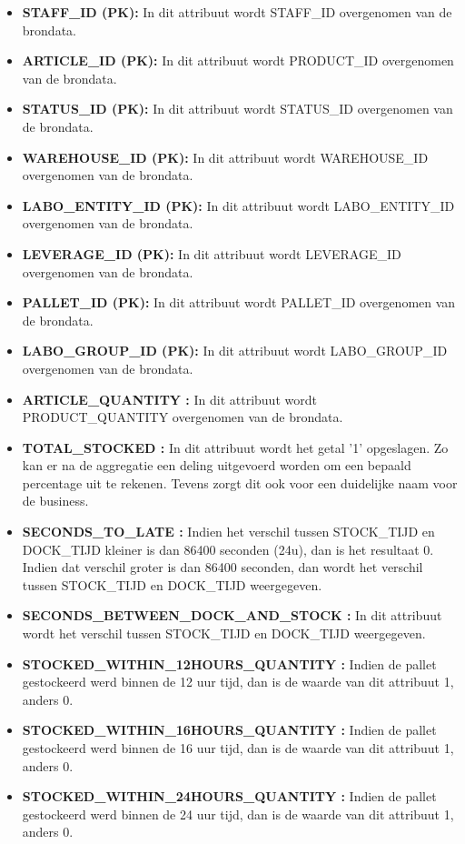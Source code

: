 \begin{itemize}
	\item \textbf{STAFF\_ID (PK):} In dit attribuut wordt STAFF\_ID overgenomen van de brondata.
	\item \textbf{ARTICLE\_ID (PK):} In dit attribuut wordt PRODUCT\_ID overgenomen van de brondata.
	\item \textbf{STATUS\_ID (PK):} In dit attribuut wordt STATUS\_ID overgenomen van de brondata.
	\item \textbf{WAREHOUSE\_ID (PK):} In dit attribuut wordt WAREHOUSE\_ID overgenomen van de brondata.
	\item \textbf{LABO\_ENTITY\_ID (PK):} In dit attribuut wordt LABO\_ENTITY\_ID overgenomen van de brondata.
	\item \textbf{LEVERAGE\_ID (PK):} In dit attribuut wordt LEVERAGE\_ID overgenomen van de brondata.
	\item \textbf{PALLET\_ID (PK):} In dit attribuut wordt PALLET\_ID overgenomen van de brondata.
	\item \textbf{LABO\_GROUP\_ID (PK):} In dit attribuut wordt LABO\_GROUP\_ID overgenomen van de brondata.
	\item \textbf{ARTICLE\_QUANTITY :} In dit attribuut wordt PRODUCT\_QUANTITY overgenomen van de brondata.
	\item \textbf{TOTAL\_STOCKED :} In dit attribuut wordt het getal '1' opgeslagen. Zo kan er na de aggregatie een deling uitgevoerd worden om een bepaald percentage uit te rekenen. Tevens zorgt dit ook voor een duidelijke naam voor de business.
	\item \textbf{SECONDS\_TO\_LATE :} Indien het verschil tussen STOCK\_TIJD en DOCK\_TIJD kleiner is dan 86400 seconden (24u), dan is het resultaat 0. Indien dat verschil groter is dan 86400 seconden, dan wordt het verschil tussen STOCK\_TIJD en DOCK\_TIJD weergegeven.
	\item \textbf{SECONDS\_BETWEEN\_DOCK\_AND\_STOCK :} In dit attribuut wordt het verschil tussen STOCK\_TIJD en DOCK\_TIJD weergegeven.
	\item \textbf{STOCKED\_WITHIN\_12HOURS\_QUANTITY :} Indien de pallet gestockeerd werd binnen de 12 uur tijd, dan is de waarde van dit attribuut 1, anders 0.
	\item \textbf{STOCKED\_WITHIN\_16HOURS\_QUANTITY :} Indien de pallet gestockeerd werd binnen de 16 uur tijd, dan is de waarde van dit attribuut 1, anders 0.
	\item \textbf{STOCKED\_WITHIN\_24HOURS\_QUANTITY :} Indien de pallet gestockeerd werd binnen de 24 uur tijd, dan is de waarde van dit attribuut 1, anders 0.
\end{itemize} 

